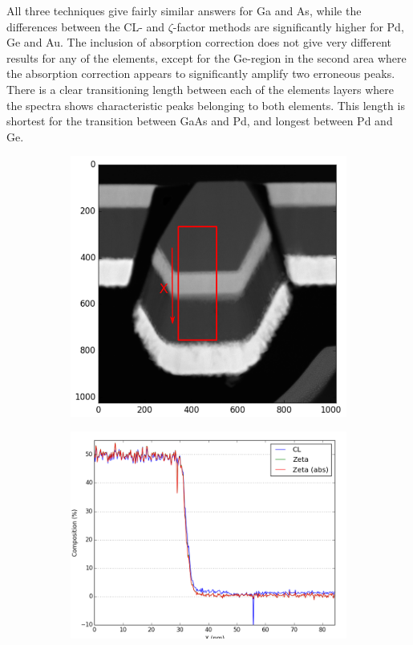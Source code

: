 All three techniques give fairly similar answers for Ga and As, while the differences between the CL- and $\zeta$-factor methods are significantly higher for Pd, Ge and Au. The inclusion of absorption correction does not give very different results for any of the elements, except for the Ge-region in the second area where the absorption correction appears to significantly amplify two erroneous peaks.
There is a clear transitioning length between each of the elements layers where the spectra shows characteristic peaks belonging to both elements. This length is shortest for the transition between GaAs and Pd, and longest between Pd and Ge.

\begin{figure}
	\begin{subfigure}{.5\textwidth}
		\centering
		\newlength\imageheight
		\includegraphics[width=.68\linewidth]{fig/q/1_overview3}
		\caption{}
		\label{fig:zeta_area1_overview}
	\end{subfigure}
	\begin{subfigure}{.45\textwidth}
		\centering
		\includegraphics[width=\linewidth]{fig/q-new/oldzetas_Sa_Ga_Ka}

\end{subfigure}
\end{figure}
